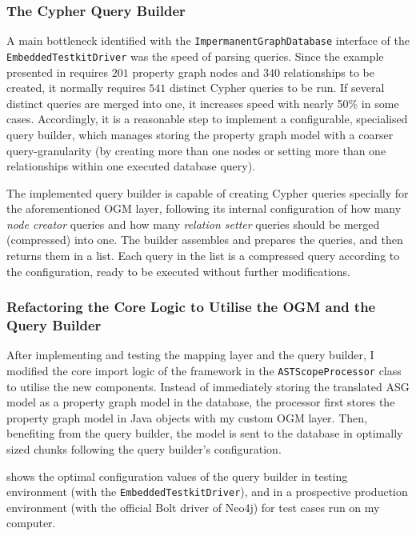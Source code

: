 \subsubsection{The Cypher Query Builder}

A main bottleneck identified with the \lstinline{ImpermanentGraphDatabase} interface of the \lstinline{EmbeddedTestkitDriver} was the speed of parsing queries. Since the example presented in  requires $201$ property graph nodes and $340$ relationships to be created, it normally requires $541$ distinct Cypher queries to be run. If several distinct queries are merged into one, it increases speed with nearly 50\% in some cases. Accordingly, it is a reasonable step to implement a configurable, specialised query builder, which manages storing the property graph model with a coarser query-granularity (by creating more than one nodes or setting more than one relationships within one executed database query).

The implemented query builder is capable of creating Cypher queries specially for the aforementioned OGM layer, following its internal configuration of how many \emph{node creator} queries and how many \emph{relation setter} queries should be merged (compressed) into one. The builder assembles and prepares the queries, and then returns them in a list. Each query in the list is a compressed query according to the configuration, ready to be executed without further modifications.


\subsubsection{Refactoring the Core Logic to Utilise the OGM and the Query Builder}

After implementing and testing the mapping layer and the query builder, I modified the core import logic of the framework in the \lstinline{ASTScopeProcessor} class to utilise the new components. Instead of immediately storing the translated ASG model as a property graph model in the database, the processor first stores the property graph model in Java objects with my custom OGM layer. Then, benefiting from the query builder, the model is sent to the database in optimally sized chunks following the query builder's configuration.

 shows the optimal configuration values of the query builder in testing environment (with the \lstinline{EmbeddedTestkitDriver}), and in a prospective production environment (with the official Bolt driver of Neo4j) for test cases run on my computer.

